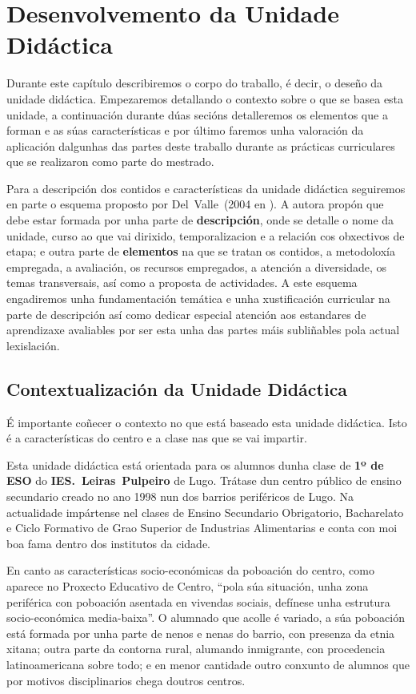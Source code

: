 \chapter{Desenvolvemento da Unidade Didáctica}\label{chap:desenvolvemento}
Durante este capítulo describiremos o corpo do traballo, é decir, o deseño da unidade didáctica. Empezaremos detallando o contexto sobre o que se basea esta unidade, a continuación durante dúas secións detalleremos os elementos que a forman e as súas características e por último faremos unha valoración da aplicación dalgunhas das partes deste traballo durante as prácticas curriculares que se realizaron como parte do mestrado.

Para a descripción dos contidos e características da unidade didáctica seguiremos en parte o esquema proposto por Del~Valle~(2004 en ). A autora propón que debe estar formada por unha parte de \textbf{descripción}, onde se detalle o nome da unidade, curso ao que vai dirixido, temporalizacion e a relación cos obxectivos de etapa; e outra parte de \textbf{elementos} na que se tratan os contidos, a metodoloxía empregada, a avaliación, os recursos empregados, a atención a diversidade, os temas transversais, así como a proposta de actividades. A este esquema engadiremos unha fundamentación temática e unha xustificación curricular na parte de descripción así como dedicar especial atención aos estandares de aprendizaxe avaliables por ser esta unha das partes máis subliñables pola actual lexislación.

\section{Contextualización da Unidade Didáctica}
É importante coñecer o contexto no que está baseado esta unidade didáctica. Isto é a características do centro e a clase nas que se vai impartir.

Esta unidade didáctica está orientada para os alumnos dunha clase de \textbf{1º de ESO} do \textbf{IES.~Leiras~Pulpeiro} de Lugo. Trátase dun centro público de ensino secundario creado no ano 1998 nun dos barrios periféricos de Lugo. Na actualidade impártense nel clases de Ensino Secundario Obrigatorio, Bacharelato e Ciclo Formativo de Grao Superior de Industrias Alimentarias e conta con moi boa fama dentro dos institutos da cidade.

En canto as características socio-económicas da poboación do centro, como aparece no Proxecto Educativo de Centro, ``pola súa situación, unha zona periférica con poboación asentada en vivendas sociais, defínese unha estrutura socio-económica media-baixa''. O alumnado que acolle é variado, a súa poboación está formada por unha parte de nenos e nenas do barrio, con presenza da etnia xitana; outra parte da contorna rural, alumando inmigrante, con procedencia latinoamericana sobre todo; e en menor cantidade outro conxunto de alumnos que por motivos disciplinarios chega doutros centros.

